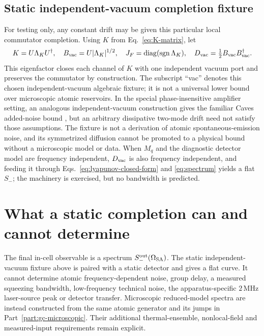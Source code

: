 \documentclass[11pt,a4paper]{article}
\newcommand{\MHz}{\,\mathrm{MHz}}
\begin{document}
\subsection{Static independent-vacuum completion fixture}

For testing only, any constant drift may be given this particular local
commutator completion. Using $K$ from Eq.~\eqref{eq:K-matrix}, let
\begin{equation}
K=U\Lambda_KU^\dagger,\quad
B_{\rm vac}=U|\Lambda_K|^{1/2},\quad
J_F=\operatorname{diag}(\operatorname{sgn}\Lambda_K),\quad
D_{\rm vac}=\tfrac12B_{\rm vac}B_{\rm vac}^\dagger .
\label{eq:minimal-dilation}
\end{equation}
This eigenfactor closes each channel of $K$ with one independent vacuum port
and preserves the commutator by construction. The subscript ``vac'' denotes
this chosen independent-vacuum algebraic fixture; it is not a universal lower
bound over microscopic atomic reservoirs. In the special phase-insensitive amplifier
setting, an analogous independent-vacuum construction gives the familiar
Caves added-noise bound \cite{Caves1982}, but an arbitrary dissipative
two-mode drift need not satisfy those assumptions. The fixture is not a
derivation of atomic spontaneous-emission noise, and its symmetrized diffusion
cannot be promoted to a physical bound without a microscopic model or data. When
$M_q$ and the diagnostic detector model are frequency independent,
$D_{\rm vac}$ is also frequency independent, and feeding it through
Eqs.~\eqref{eq:lyapunov-closed-form} and \eqref{eq:spectrum} yields a flat
$S_-$; the machinery is exercised, but no bandwidth is predicted.

\section{What a static completion can and cannot determine}
The final in-cell observable is a spectrum $S_-^{\rm out}(\Omega_{\rm SA})$.
The static independent-vacuum fixture above is paired with a static detector
and gives a flat curve. It cannot determine atomic frequency-dependent noise,
group delay, a measured squeezing bandwidth, low-frequency technical noise,
the apparatus-specific $2\MHz$ laser-source peak or detector transfer.
Microscopic reduced-model spectra are instead constructed from the same
atomic generator and its jumps in Part~\ref{part:gc-microscopic}. Their
additional thermal-ensemble, nonlocal-field and measured-input requirements
remain explicit.
\end{document}
